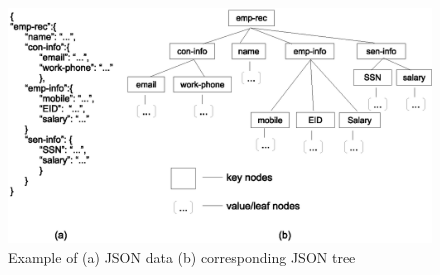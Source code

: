 	\begin{figure} [t]
 		\centering
 		\includegraphics[width=1\textwidth]{JSON-example}
 		\caption{Example of (a) JSON data (b) corresponding JSON tree}
 		\label{fig:JSON-example}
 	\end{figure}
